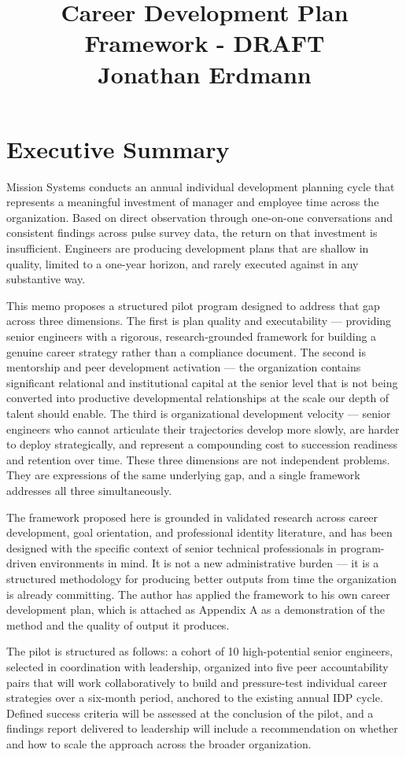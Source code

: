 \documentclass{article}
\title{Career Development Plan Framework - DRAFT \\ [1em]
	\large Jonathan Erdmann \\ [1em]
}
\begin{document}
\section{Executive Summary}
Mission Systems conducts an annual individual development planning cycle that represents a meaningful investment of manager and 
employee time across the organization. Based on direct observation through one-on-one conversations and consistent findings across 
pulse survey data, the return on that investment is insufficient. Engineers are producing development plans that are shallow in 
quality, limited to a one-year horizon, and rarely executed against in any substantive way.

This memo proposes a structured pilot program designed to address that gap across three dimensions. The first is plan quality and executability 
— providing senior engineers with a rigorous, research-grounded framework for building a genuine career strategy rather than a compliance document. 
The second is mentorship and peer development activation — the organization contains significant relational and institutional capital at the 
senior level that is not being converted into productive developmental relationships at the scale our depth of talent should enable. The third 
is organizational development velocity — senior engineers who cannot articulate their trajectories develop more slowly, are harder to deploy 
strategically, and represent a compounding cost to succession readiness and retention over time. These three dimensions are not independent problems. 
They are expressions of the same underlying gap, and a single framework addresses all three simultaneously.

The framework proposed here is grounded in validated research across career development, goal orientation, and professional identity literature, 
and has been designed with the specific context of senior technical professionals in program-driven environments in mind. It is not a new 
administrative burden — it is a structured methodology for producing better outputs from time the organization is already committing. The author 
has applied the framework to his own career development plan, which is attached as Appendix A as a demonstration of the method and the quality of output it produces.

The pilot is structured as follows: a cohort of 10 high-potential senior engineers, selected in coordination with leadership, 
organized into five peer accountability pairs that will work collaboratively to build and pressure-test individual career strategies over 
a six-month period, anchored to the existing annual IDP cycle. Defined success criteria will be assessed at the conclusion of the pilot, and a 
findings report delivered to leadership will include a recommendation on whether and how to scale the approach across the broader organization.
\end{document}
